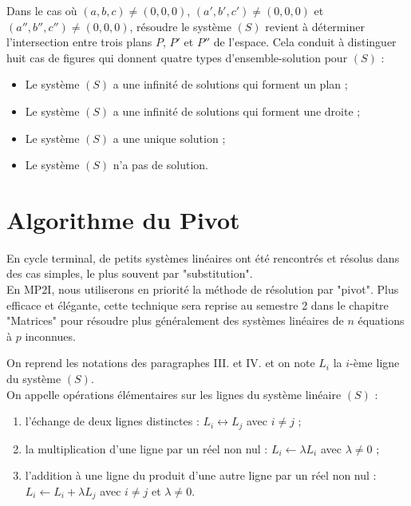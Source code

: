 \begin{defprop}
	Dans le cas où \((a,b,c)\neq (0,0,0)\), \((a',b',c')\neq (0,0,0)\) et \((a'',b'',c'')\neq (0,0,0)\), résoudre le système \((S)\) revient à déterminer l’intersection entre trois plans \(P\), \(P'\) et \(P''\) de l’espace.
	Cela conduit à distinguer huit cas de figures qui donnent quatre types d’ensemble-solution pour \((S)\) :
	\begin{itemize}
		\item Le système \((S)\) a une infinité de solutions qui forment un plan ;
		\item Le système \((S)\) a une infinité de solutions qui forment une droite ;
		\item Le système \((S)\) a une unique solution ;
		\item Le système \((S)\) n’a pas de solution.
	\end{itemize}
\end{defprop}

\section{Algorithme du Pivot}
\begin{rem} 
	En cycle terminal, de petits systèmes linéaires ont été rencontrés et résolus dans des cas simples, le plus souvent par "substitution". \\
	En MP2I, nous utiliserons en priorité la méthode de résolution par "pivot". Plus efficace et élégante, cette technique sera reprise au semestre 2 dans le chapitre "Matrices" pour résoudre plus généralement des systèmes linéaires de \(n\) équations à \(p\) inconnues.
\end{rem}

\begin{defprop}
	On reprend les notations des paragraphes III. et IV. et on note \(L_i\) la \(i\)-ème ligne du système \((S)\).\\
	On appelle opérations élémentaires sur les lignes du système linéaire \((S)\) :
	\begin{enumerate}
		\item l’échange de deux lignes distinctes : \(L_i \leftrightarrow L_j\) avec \(i\neq j\) ;
		\item la multiplication d'une ligne par un réel non nul : \(L_i \leftarrow \lambda L_i\) avec \(\lambda\neq 0\) ;
		\item l'addition à une ligne du produit d'une autre ligne par un réel non nul : \(L_i \leftarrow L_i + \lambda L_j\) avec \(i\neq j\) et \(\lambda\neq 0\).
	\end{enumerate}
\end{defprop}

